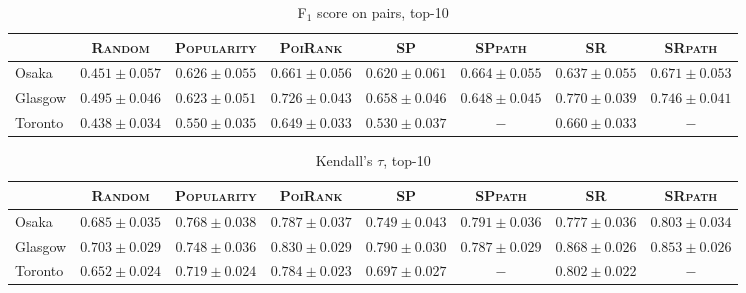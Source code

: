 \begin{table*}[!h]
\caption{F$_1$ score on pairs, top-10}
\centering
\small
\setlength{\tabcolsep}{4pt} %
\begin{tabular}{l|cc|cc|ccc} \hline
 & \textsc{Random} & \textsc{Popularity} & \textsc{PoiRank} & \textsc{SP} & \textsc{SPpath} & \textsc{SR} & \textsc{SRpath} \\ \hline
Osaka & $0.451\pm0.057$ & $0.626\pm0.055$ & $0.661\pm0.056$ & $0.620\pm0.061$ & $\mathit{0.664\pm0.055}$ & $0.637\pm0.055$ & $\mathbf{0.671\pm0.053}$ \\
Glasgow & $0.495\pm0.046$ & $0.623\pm0.051$ & $0.726\pm0.043$ & $0.658\pm0.046$ & $0.648\pm0.045$ & $\mathbf{0.770\pm0.039}$ & $\mathit{0.746\pm0.041}$ \\
Toronto & $0.438\pm0.034$ & $0.550\pm0.035$ & $\mathit{0.649\pm0.033}$ & $0.530\pm0.037$ & $-$ & $\mathbf{0.660\pm0.033}$ & $-$ \\
\hline
\end{tabular}
\end{table*}

\begin{table*}[!h]
\caption{Kendall's $\tau$, top-10}
\centering
\small
\setlength{\tabcolsep}{4pt} %
\begin{tabular}{l|cc|cc|ccc} \hline
 & \textsc{Random} & \textsc{Popularity} & \textsc{PoiRank} & \textsc{SP} & \textsc{SPpath} & \textsc{SR} & \textsc{SRpath} \\ \hline
Osaka & $0.685\pm0.035$ & $0.768\pm0.038$ & $0.787\pm0.037$ & $0.749\pm0.043$ & $\mathit{0.791\pm0.036}$ & $0.777\pm0.036$ & $\mathbf{0.803\pm0.034}$ \\
Glasgow & $0.703\pm0.029$ & $0.748\pm0.036$ & $0.830\pm0.029$ & $0.790\pm0.030$ & $0.787\pm0.029$ & $\mathbf{0.868\pm0.026}$ & $\mathit{0.853\pm0.026}$ \\
Toronto & $0.652\pm0.024$ & $0.719\pm0.024$ & $\mathit{0.784\pm0.023}$ & $0.697\pm0.027$ & $-$ & $\mathbf{0.802\pm0.022}$ & $-$ \\
\hline
\end{tabular}
\end{table*}
